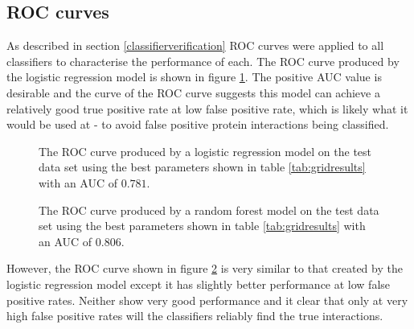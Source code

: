 \subsection{ROC curves}

As described in section \ref{classifierverification} ROC curves were applied to all classifiers to characterise the performance of each.
The ROC curve produced by the logistic regression model is shown in figure \ref{fig:logroc}.
The positive AUC value is desirable and the curve of the ROC curve suggests this model can achieve a relatively good true positive rate at low false positive rate, which is likely what it would be used at - to avoid false positive protein interactions being classified.

\begin{figure}
    \centering
    \setlength\figureheight{2in}
    \setlength\figurewidth{3in}
    \caption{The ROC curve produced by a logistic regression model on the test data set using the best parameters shown in table \ref{tab:gridresults} with an AUC of $0.781$.}
    \label{fig:logroc}
\end{figure}

\begin{figure}
    \centering
    \setlength\figureheight{2in}
    \setlength\figurewidth{3in}
    \caption{The ROC curve produced by a random forest model on the test data set using the best parameters shown in table \ref{tab:gridresults} with an AUC of $0.806$.}
    \label{fig:rfroc}
\end{figure}


However, the ROC curve shown in figure \ref{fig:rfroc} is very similar to that created by the logistic regression model except it has slightly better performance at low false positive rates.
Neither show very good performance and it clear that only at very high false positive rates will the classifiers reliably find the true interactions.

